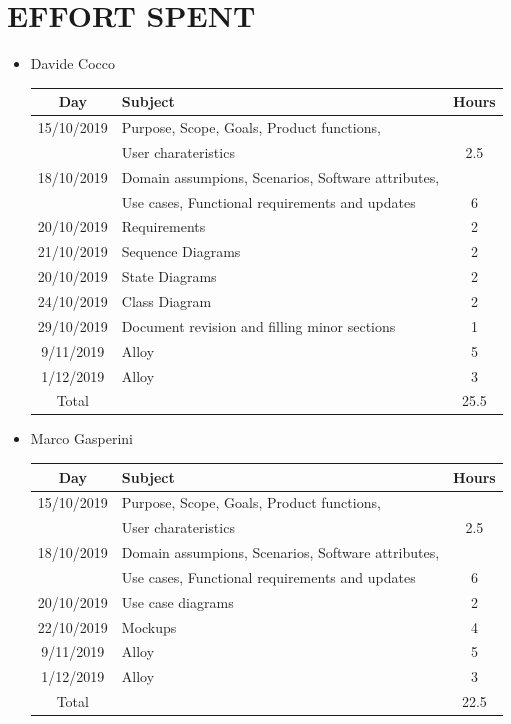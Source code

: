 \documentclass[12pt,a4paper]{article}
\begin{document}
\newpage
\section{EFFORT	SPENT}
\begin{itemize}
\item {Davide Cocco}
 \begin{center}
			\begin{tabular}{| c | l | c |}
				\hline
				\textbf{Day} & \textbf{Subject} & \textbf{Hours} \\ \hline
				15/10/2019 & Purpose, Scope, Goals, Product functions,&\\
				&User charateristics & 2.5 \\ \hline
				18/10/2019 & Domain assumpions, Scenarios, Software attributes,&\\
				& Use cases, Functional requirements and updates  & 6\\ \hline
				20/10/2019 & Requirements  & 2\\	\hline
				21/10/2019 & Sequence Diagrams  & 2\\ \hline
				20/10/2019 & State Diagrams  & 2\\ \hline
				24/10/2019 & Class Diagram  & 2\\ \hline
				29/10/2019 & Document revision and filling minor sections & 1\\ \hline
				9/11/2019 & Alloy & 5\\ \hline
				1/12/2019 & Alloy & 3\\ \hline
				Total & & 25.5 \\ \hline
			\end{tabular}
		\end{center}
\item {Marco Gasperini}
\begin{center}
			\begin{tabular}{| c | l | c |}
				\hline
				\textbf{Day} & \textbf{Subject} & \textbf{Hours} \\ \hline
				15/10/2019 & Purpose, Scope, Goals, Product functions,&\\
				&User charateristics & 2.5 \\ \hline
				18/10/2019 & Domain assumpions, Scenarios, Software attributes,&\\
				& Use cases, Functional requirements and updates  & 6\\ \hline
				20/10/2019 & Use case diagrams & 2\\ \hline
				22/10/2019 & Mockups & 4\\ \hline	
				9/11/2019 & Alloy & 5\\ \hline
1/12/2019 & Alloy & 3\\ \hline
				Total & & 22.5 \\ \hline
			\end{tabular}
\end{center}
\end{itemize}
\end{document}
